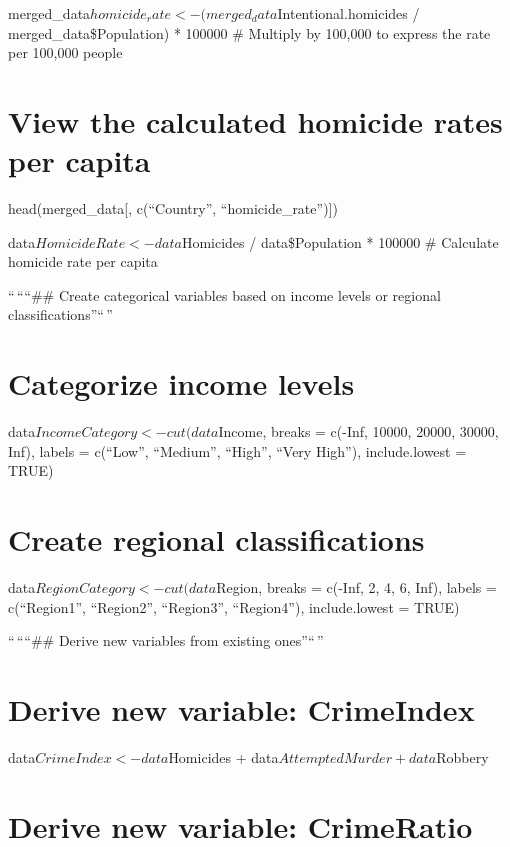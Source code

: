 \documentclass[
]{article}
\begin{document}
merged\_data\(homicide_rate <- (merged_data\)Intentional.homicides /
merged\_data\$Population) * 100000 \# Multiply by 100,000 to express the
rate per 100,000 people

\hypertarget{view-the-calculated-homicide-rates-per-capita}{%
\section{View the calculated homicide rates per
capita}\label{view-the-calculated-homicide-rates-per-capita}}

head(merged\_data{[}, c(``Country'', ``homicide\_rate''){]})

data\(HomicideRate <- data\)Homicides / data\$Population * 100000 \#
Calculate homicide rate per capita

``\,````\#\# Create categorical variables based on income levels or
regional classifications''``\,''

\hypertarget{categorize-income-levels}{%
\section{Categorize income levels}\label{categorize-income-levels}}

data\(IncomeCategory <- cut(data\)Income, breaks = c(-Inf, 10000, 20000,
30000, Inf), labels = c(``Low'', ``Medium'', ``High'', ``Very High''),
include.lowest = TRUE)

\hypertarget{create-regional-classifications}{%
\section{Create regional
classifications}\label{create-regional-classifications}}

data\(RegionCategory <- cut(data\)Region, breaks = c(-Inf, 2, 4, 6,
Inf), labels = c(``Region1'', ``Region2'', ``Region3'', ``Region4''),
include.lowest = TRUE)

``\,````\#\# Derive new variables from existing ones''``\,''

\hypertarget{derive-new-variable-crimeindex}{%
\section{Derive new variable:
CrimeIndex}\label{derive-new-variable-crimeindex}}

data\(CrimeIndex <- data\)Homicides +
data\(AttemptedMurder + data\)Robbery

\hypertarget{derive-new-variable-crimeratio}{%
\section{Derive new variable:
CrimeRatio}\label{derive-new-variable-crimeratio}}
\end{document}

